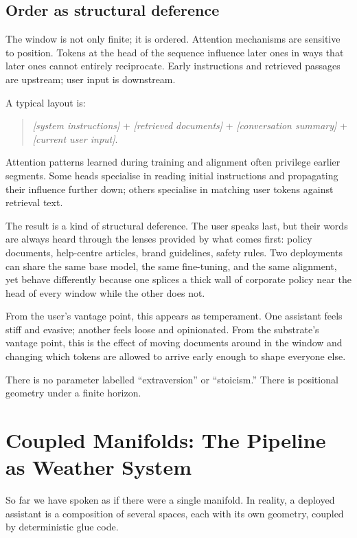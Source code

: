 \subsection*{Order as structural deference}

The window is not only finite; it is ordered. Attention mechanisms are sensitive to position. Tokens at the head of the sequence influence later ones in ways that later ones cannot entirely reciprocate. Early instructions and retrieved passages are upstream; user input is downstream.

A typical layout is:

\begin{quote}
\emph{[system instructions]} + \emph{[retrieved documents]} + \emph{[conversation summary]} + \emph{[current user input]}.
\end{quote}

Attention patterns learned during training and alignment often privilege earlier segments. Some heads specialise in reading initial instructions and propagating their influence further down; others specialise in matching user tokens against retrieval text.

The result is a kind of structural deference. The user speaks last, but their words are always heard through the lenses provided by what comes first: policy documents, help-centre articles, brand guidelines, safety rules. Two deployments can share the same base model, the same fine-tuning, and the same alignment, yet behave differently because one splices a thick wall of corporate policy near the head of every window while the other does not.

From the user's vantage point, this appears as temperament. One assistant feels stiff and evasive; another feels loose and opinionated. From the substrate's vantage point, this is the effect of moving documents around in the window and changing which tokens are allowed to arrive early enough to shape everyone else.

There is no parameter labelled ``extraversion'' or ``stoicism.'' There is positional geometry under a finite horizon.

\section{Coupled Manifolds: The Pipeline as Weather System}

So far we have spoken as if there were a single manifold. In reality, a deployed assistant is a composition of several spaces, each with its own geometry, coupled by deterministic glue code.

